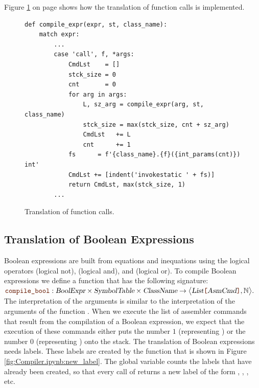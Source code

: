 \begin{enumerate}
      Figure \ref{fig:Compiler.ipynb:compile:call} on page \pageref{fig:Compiler.ipynb:compile:call} shows how the
      translation of function calls is implemented.


\begin{figure}[!ht]
\centering
\begin{verbatim}
def compile_expr(expr, st, class_name):
    match expr:
        ...
        case 'call', f, *args:
            CmdLst    = []
            stck_size = 0
            cnt       = 0
            for arg in args:
                L, sz_arg = compile_expr(arg, st, class_name)
                stck_size = max(stck_size, cnt + sz_arg)
                CmdLst   += L
                cnt      += 1
            fs      = f'{class_name}.{f}({int_params(cnt)}) int'
            CmdLst += [indent('invokestatic ' + fs)]
            return CmdLst, max(stck_size, 1)
        ...
\end{verbatim}
\vspace*{-0.3cm}
\caption{Translation of function calls.}
\label{fig:Compiler.ipynb:compile:call}
\end{figure}
\end{enumerate}



\subsection{Translation of Boolean Expressions}
Boolean expressions are built from equations and inequations using the logical operators
\qote{!} (logical not), \qote{\&\&} (logical and), and \qote{||} (logical or).
To compile Boolean expressions we define a function
 that has the following signature:
\\[0.2cm]
\hspace*{1.3cm}
$\mytt{compile\_bool}: \textsl{BoolExpr} \times \textsl{SymbolTable} \times \textsl{ClassName} \rightarrow 
                 \bigl\langle\textsl{List}\mytt{[}\textsl{AsmCmd}\mytt{]}, \mathbb{N}\bigr\rangle.$
\\[0.2cm]
The interpretation of the arguments is similar to the interpretation of the arguments
of the function .  
When we execute the list of assembler commands that result from the compilation of a Boolean expression, we
expect that the execution of these commands either puts the number $1$ (representing ) or the
number $0$ (representing ) onto the stack. 
The translation of Boolean expressions needs labels.  These labels are created by the function
 that is shown in Figure \ref{fig:Compiler.ipynb:new_label}.  The global variable
 counts the labels that have already been created, so that every call of 
returns a new label of the form , , , etc.

